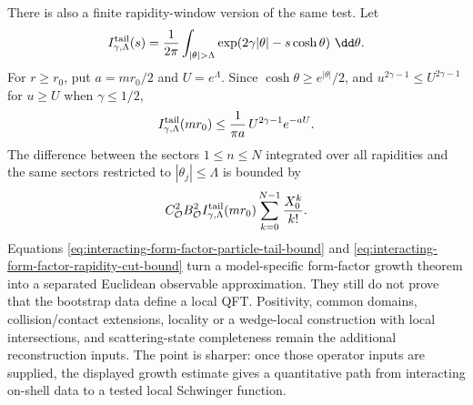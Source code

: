 \begin{controlledapproximation}
There is also a finite rapidity-window version of the same test.  Let
\[
  I_{\gamma,\Lambda}^{\rm tail}(s)
  =
  \frac1{2\pi}
  \int_{|\theta|>\Lambda}
  \exp\!\left(2\gamma|\theta|-s\cosh\theta\right)\,\dd\theta .
\]
For \(r\ge r_0\), put \(a=mr_0/2\) and \(U=e^\Lambda\).  Since
\(\cosh\theta\ge e^{|\theta|}/2\), and
\(u^{2\gamma-1}\le U^{2\gamma-1}\) for \(u\ge U\) when
\(\gamma\le1/2\),
\begin{equation}
  I_{\gamma,\Lambda}^{\rm tail}(mr_0)
  \le
  \frac{1}{\pi a}\,
  U^{2\gamma-1}e^{-aU}.
  \label{eq:interacting-form-factor-rapidity-tail-majorant}
\end{equation}
The difference between the sectors \(1\le n\le N\) integrated over all
rapidities and the same sectors restricted to \(|\theta_j|\le\Lambda\) is
bounded by
\begin{equation}
  C_{\mathcal O}^2B_{\mathcal O}^2
  I_{\gamma,\Lambda}^{\rm tail}(mr_0)
  \sum_{k=0}^{N-1}\frac{X_0^k}{k!}.
  \label{eq:interacting-form-factor-rapidity-cut-bound}
\end{equation}
Equations
\eqref{eq:interacting-form-factor-particle-tail-bound} and
\eqref{eq:interacting-form-factor-rapidity-cut-bound} turn a model-specific
form-factor growth theorem into a separated Euclidean observable
approximation.  They still do not prove that the bootstrap data define a
local QFT.  Positivity, common domains, collision/contact extensions,
locality or a wedge-local construction with local intersections, and
scattering-state completeness remain the additional reconstruction inputs.
The point is sharper: once those operator inputs are supplied, the displayed
growth estimate gives a quantitative path from interacting on-shell data to a
tested local Schwinger function.
\end{controlledapproximation}

